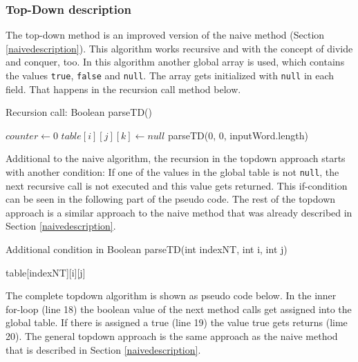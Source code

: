 \documentclass[a4paper, 11pt]{article}
\begin{document}


\subsubsection{Top-Down description}
\label{topdowndescription}


The top-down method is an improved version of the naive method (Section \ref{naivedescription}). This algorithm works recursive and with the concept of divide and conquer, too. In this algorithm another global array is used, which contains the values \texttt{true}, \texttt{false} and \texttt{null}. The array gets initialized with \texttt{null} in each field. That happens in the recursion call method below.

\begin{algorithm}[H]
\caption{Recursion call: Boolean parseTD()}\label{alg:cap}
\begin{algorithmic}[1]
\State $counter \gets 0$
\State $table[i][j][k] \gets null$
\EndFor
\EndFor
\EndFor
\State \Return parseTD(0, 0, inputWord.length)
\end{algorithmic}
\end{algorithm}

Additional to the naive algorithm, the recursion in the topdown approach starts with another condition: If one of the values in the global table is not \texttt{null}, the next recursive call is not executed and this value gets returned. This if-condition can be seen in the following part of the pseudo code. The rest of the topdown approach is a similar approach to the naive method that was already described in Section \ref{naivedescription}.

\begin{algorithm}[H]
\caption{Additional condition in Boolean parseTD(int indexNT, int i, int j)}\label{alg:cap}
\begin{algorithmic}[1]
\State \Return table[indexNT][i][j]
\EndIf
\end{algorithmic}
\end{algorithm}

The complete topdown algorithm is shown as pseudo code below. In the inner for-loop (line 18) the boolean value of the next method calls get assigned into the global table. If there is assigned a true (line 19) the value true gets returns (lime 20). The general topdown approach is the same approach as the naive method that is described in Section \ref{naivedescription}.
\end{document}
